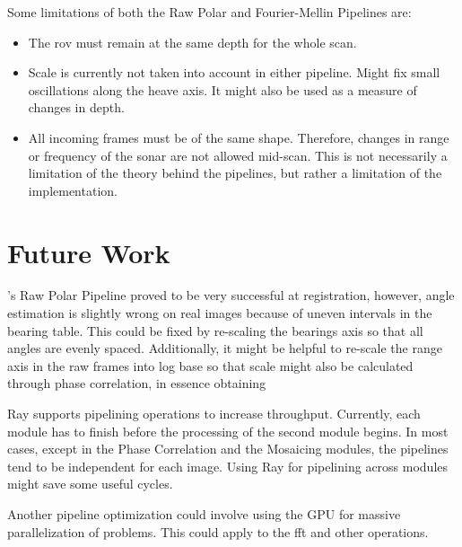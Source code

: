 Some limitations of both the Raw Polar and Fourier-Mellin Pipelines are:

\begin{itemize}
    \item The \acrshort{rov} must remain at the same depth for the whole scan.
    \item Scale is currently not taken into account in either pipeline. Might fix small oscillations along the heave axis. It might also be used as a measure of changes in depth.
    \item All incoming frames must be of the same shape. Therefore, changes in range or frequency of the sonar are not allowed mid-scan. This is not necessarily a limitation of the theory behind the pipelines, but rather a limitation of the implementation.
\end{itemize}


\section{Future Work}

\citeauthor{Hurtos2015}'s Raw Polar Pipeline proved to be very successful at registration, however, angle estimation is slightly wrong on real images because of uneven intervals in the bearing table. This could be fixed by re-scaling the bearings axis so that all angles are evenly spaced. Additionally, it might be helpful to re-scale the range axis in the raw frames into log base so that scale might also be calculated through phase correlation, in essence obtaining 

Ray supports pipelining operations to increase throughput. Currently, each module has to finish before the processing of the second module begins. In most cases, except in the Phase Correlation and the Mosaicing modules, the pipelines tend to be independent for each image. Using Ray for pipelining across modules might save some useful cycles. 

Another pipeline optimization could involve using the GPU for massive parallelization of problems. This could apply to the \acrshort{fft} and other operations. 